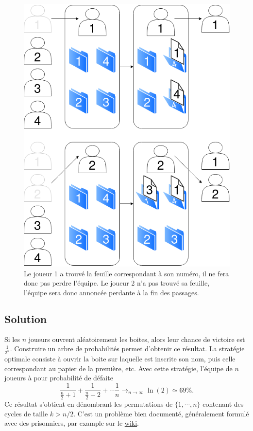 \documentclass[a4paper,10pt,oneside]{article}
\begin{document}
\begin{figure}[!h]
  \centering
  \includegraphics[height=0.3\textheight]{figures/boites.png}
  \caption{Le joueur 1 a trouvé la feuille correspondant à son numéro, il ne fera donc pas perdre l'équipe. Le joueur 2 n'a pas trouvé sa feuille, l'équipe sera donc annoncée perdante à la fin des passages.}
\end{figure}


\subsection{Solution}

Si les $n$ joueurs ouvrent aléatoirement les boites, alors leur chance de victoire est $\frac{1}{2^n}$. 
Construire un arbre de probabilités permet d'obtenir ce résultat.
La stratégie optimale consiste à ouvrir la boite sur laquelle est inscrite son nom, puis celle correspondant au papier de la première, etc. 
Avec cette stratégie, l'équipe de $n$ joueurs à pour probabilité de défaite
\[
  \frac{1}{\frac{n}{2} +1} + \frac{1}{\frac{n}{2} + 2} + \cdots \frac{1}{n} 
  \rightarrow_{n\rightarrow \infty} \ln(2) \simeq 69\%.
\]
Ce résultat s'obtient en dénombrant les permutations de $\{1,\cdots,n\}$ contenant des cycles de taille $k > n/2$.
C'est un problème bien documenté, généralement formulé avec des prisonniers, par example sur le \href{https://en.wikipedia.org/wiki/100_prisoners_problem}{wiki}.


\newpage
  

\end{document}

